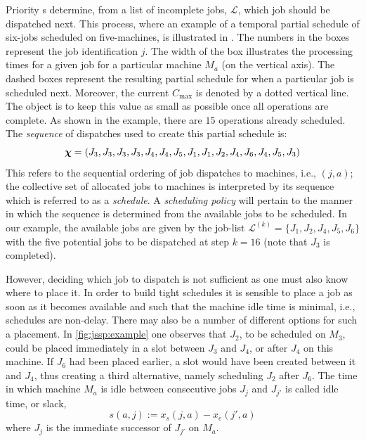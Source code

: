 \documentclass[smallextended]{svjour3}
\begin{document}
	Priority \dr s determine, from a list of incomplete jobs, 
	$\mathcal{L}$, which job should be dispatched next. This process, where an example of 
	a temporal partial schedule of six-jobs scheduled on five-machines, is illustrated in  .
	The numbers in the boxes represent the job identification $j$. 
	The width of the box illustrates the processing times for a given job for a 
	particular machine $M_a$ (on the vertical axis). 
	The dashed boxes represent the resulting partial schedule for when a particular 
	job is scheduled next. 
	Moreover, the current $C_{\max}$ is denoted by a dotted vertical line. 
	The object is to keep this value as small as possible once all operations are 
	complete. As shown in the example, there are $15$ operations already scheduled. 
	The \textit{sequence} of dispatches used to create this partial schedule is:
	\begin{equation}
	\bm \chi=\left(J_3,J_3,J_3,J_3,J_4,J_4,J_5,J_1,J_1,J_2,J_4,J_6,J_4,J_5,J_3\right)
	\end{equation}
	This refers to the sequential ordering of job dispatches to machines, i.e., $(j,a)$; 
	the collective set of allocated jobs to machines is interpreted by its 
	sequence which is referred to as a \emph{schedule}.
	A \emph{scheduling policy} will pertain to the manner in which 
	the sequence is determined from the available jobs to be scheduled. 
	In our example, the available jobs are given by the job-list
	$\mathcal{L}^{(k)}=\{J_1,J_2,J_4,J_5,J_6\}$ with the five potential jobs 
	to be dispatched at step $k=16$ (note that $J_3$ is completed).
	
	However, deciding which job to dispatch is not sufficient as one must also know 
	where to place it. In order to build tight schedules it is sensible to place a 
	job as soon as it becomes available and such that the machine idle time is 
	minimal, i.e., schedules are non-delay. 
	There may also be a number of different options for such a placement. 
	In \cref{fig:jssp:example} one observes that $J_2$, to be scheduled on $M_3$, 
	could be placed immediately in a slot between $J_3$ and $J_4$, or after $J_4$ 
	on this machine. 
	If $J_6$ had been placed earlier, a slot would have been created between it and 
	$J_4$, thus creating a third alternative, namely scheduling $J_2$ after $J_6$. 
	The time in which machine $M_a$ is idle between consecutive jobs $J_j$ and 
	$J_{j'}$ is called idle time, or slack, 
	\begin{equation} 
	s(a,j):=x_s(j,a)-x_e(j',a) \label{eq:slack}
	\end{equation}
	where $J_j$ is the immediate successor of $J_{j'}$ on $M_a$. 
	
\end{document}
